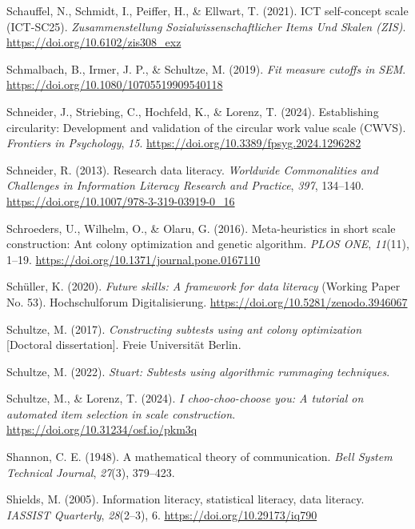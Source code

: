 \documentclass[
  12pt,
  a4paper,
  twoside]{article}
\newlength{\cslhangindent}
\newenvironment{CSLReferences}[2] %
 {\begin{list}{}{%
  \setlength{\itemindent}{0pt}
  \setlength{\leftmargin}{0pt}
  \setlength{\parsep}{0pt}
  \ifodd #1
   \setlength{\leftmargin}{\cslhangindent}
   \setlength{\itemindent}{-1\cslhangindent}
  \fi
  \setlength{\itemsep}{#2\baselineskip}}}
 {\end{list}}
\begin{document}
\begin{CSLReferences}{1}{0}
Schauffel, N., Schmidt, I., Peiffer, H., \& Ellwart, T. (2021). ICT self-concept scale (ICT-SC25). \emph{Zusammenstellung Sozialwissenschaftlicher Items Und Skalen (ZIS)}. \url{https://doi.org/10.6102/zis308_exz}

Schmalbach, B., Irmer, J. P., \& Schultze, M. (2019). \emph{Fit measure cutoffs in SEM}. \url{https://doi.org/10.1080/10705519909540118}

Schneider, J., Striebing, C., Hochfeld, K., \& Lorenz, T. (2024). Establishing circularity: Development and validation of the circular work value scale (CWVS). \emph{Frontiers in Psychology}, \emph{15}. \url{https://doi.org/10.3389/fpsyg.2024.1296282}

Schneider, R. (2013). Research data literacy. \emph{Worldwide Commonalities and Challenges in Information Literacy Research and Practice}, \emph{397}, 134--140. \url{https://doi.org/10.1007/978-3-319-03919-0_16}

Schroeders, U., Wilhelm, O., \& Olaru, G. (2016). Meta-heuristics in short scale construction: Ant colony optimization and genetic algorithm. \emph{PLOS ONE}, \emph{11}(11), 1--19. \url{https://doi.org/10.1371/journal.pone.0167110}

Schüller, K. (2020). \emph{Future skills: A framework for data literacy} (Working Paper No. 53). Hochschulforum Digitalisierung. \url{https://doi.org/10.5281/zenodo.3946067}

Schultze, M. (2017). \emph{Constructing subtests using ant colony optimization} {[}Doctoral dissertation{]}. Freie Universität Berlin.

Schultze, M. (2022). \emph{Stuart: Subtests using algorithmic rummaging techniques}.

Schultze, M., \& Lorenz, T. (2024). \emph{I choo-choo-choose you: A tutorial on automated item selection in scale construction}. \url{https://doi.org/10.31234/osf.io/pkm3q}

Shannon, C. E. (1948). A mathematical theory of communication. \emph{Bell System Technical Journal}, \emph{27}(3), 379--423.

Shields, M. (2005). Information literacy, statistical literacy, data literacy. \emph{IASSIST Quarterly}, \emph{28}(2--3), 6. \url{https://doi.org/10.29173/iq790}


\end{CSLReferences}
\end{document}
